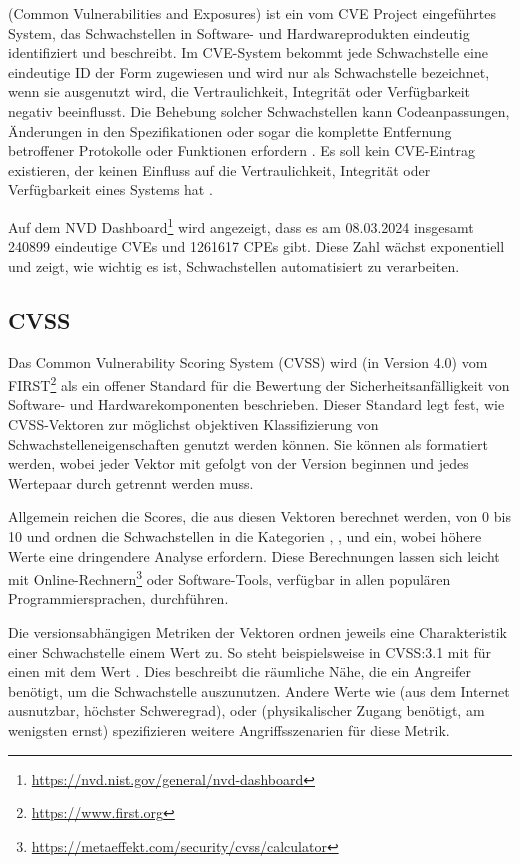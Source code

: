  (Common Vulnerabilities and Exposures) ist ein vom CVE Project eingeführtes System, das Schwachstellen in Software- und Hardwareprodukten eindeutig identifiziert und beschreibt.
Im CVE-System bekommt jede Schwachstelle eine eindeutige ID der Form  zugewiesen und wird nur als Schwachstelle bezeichnet, wenn sie ausgenutzt wird, die Vertraulichkeit, Integrität oder Verfügbarkeit negativ beeinflusst.
Die Behebung solcher Schwachstellen kann Codeanpassungen, Änderungen in den Spezifikationen oder sogar die komplette Entfernung betroffener Protokolle oder Funktionen erfordern \cite{nvdVulnerabilityDefinition}.
Es soll kein CVE-Eintrag existieren, der keinen Einfluss auf die Vertraulichkeit, Integrität oder Verfügbarkeit eines Systems hat \cite{nvdVulnerabilityMetrics}.

Auf dem NVD Dashboard\footnote{\url{https://nvd.nist.gov/general/nvd-dashboard}} wird angezeigt, dass es am 08.03.2024 insgesamt 240899 eindeutige CVEs und 1261617 CPEs gibt.
Diese Zahl wächst exponentiell und zeigt, wie wichtig es ist, Schwachstellen automatisiert zu verarbeiten.

\subsection{CVSS} \label{subsec:projektbericht-grundlagen-cvss}

Das Common Vulnerability Scoring System (CVSS) wird (in Version 4.0) \cite{CVSSv4.0Specification} vom FIRST\footnote{\url{https://www.first.org}} als ein offener Standard für die Bewertung der Sicherheitsanfälligkeit von Software- und Hardwarekomponenten beschrieben.
Dieser Standard legt fest, wie CVSS-Vektoren zur möglichst objektiven Klassifizierung von Schwachstelleneigenschaften genutzt werden können.
Sie können als  formatiert werden, wobei jeder Vektor mit  gefolgt von der Version beginnen und jedes Wertepaar durch \qt{/} getrennt werden muss.

Allgemein reichen die Scores, die aus diesen Vektoren berechnet werden, von 0 bis 10 und ordnen die Schwachstellen in die Kategorien , ,  und  ein, wobei höhere Werte eine dringendere Analyse erfordern.
Diese Berechnungen lassen sich leicht mit Online-Rechnern\footnote{\url{https://metaeffekt.com/security/cvss/calculator}} oder Software-Tools, verfügbar in allen populären Programmiersprachen, durchführen.

Die versionsabhängigen Metriken der Vektoren ordnen jeweils eine Charakteristik einer Schwachstelle einem Wert zu.
So steht beispielsweise in CVSS:3.1 mit  für einen  mit dem Wert .
Dies beschreibt die räumliche Nähe, die ein Angreifer benötigt, um die Schwachstelle auszunutzen.
Andere Werte wie  (aus dem Internet ausnutzbar, höchster Schweregrad),  oder  (physikalischer Zugang benötigt, am wenigsten ernst) spezifizieren weitere Angriffsszenarien für diese Metrik.

